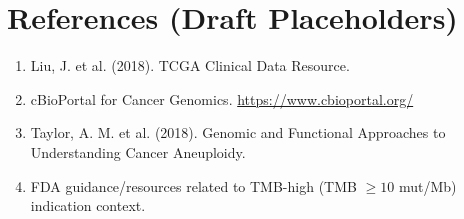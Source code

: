 \documentclass[11pt]{article}
\begin{document}
\section{References (Draft Placeholders)}
\begin{enumerate}
    \item Liu, J. et al. (2018). TCGA Clinical Data Resource.
    \item cBioPortal for Cancer Genomics. \url{https://www.cbioportal.org/}
    \item Taylor, A. M. et al. (2018). Genomic and Functional Approaches to Understanding Cancer Aneuploidy.
    \item FDA guidance/resources related to TMB-high (TMB $\ge 10$ mut/Mb) indication context.
\end{enumerate}
\end{document}
